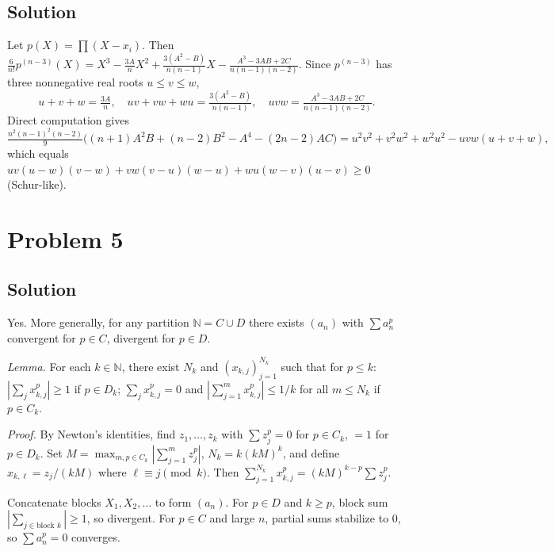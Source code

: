 \documentclass{article}
\begin{document}
\subsection*{Solution}
Let $p(X) = \prod(X - x_i)$. Then $\frac{6}{n!} p^{(n-3)}(X) = X^3 - \frac{3A}{n} X^2 + \frac{3(A^2-B)}{n(n-1)} X - \frac{A^3 - 3AB + 2C}{n(n-1)(n-2)}$. Since $p^{(n-3)}$ has three nonnegative real roots $u \le v \le w$,
\[ u+v+w = \tfrac{3A}{n},\quad uv+vw+wu = \tfrac{3(A^2-B)}{n(n-1)},\quad uvw = \tfrac{A^3-3AB+2C}{n(n-1)(n-2)}. \]
Direct computation gives
\[ \tfrac{n^2(n-1)^2(n-2)}{9}\big((n+1)A^2 B + (n-2) B^2 - A^4 - (2n-2) AC\big) = u^2 v^2 + v^2 w^2 + w^2 u^2 - uvw(u+v+w), \]
which equals $uv(u-w)(v-w) + vw(v-u)(w-u) + wu(w-v)(u-v) \ge 0$ (Schur-like).

\section*{Problem 5}
\subsection*{Solution}
Yes. More generally, for any partition $\mathbb{N} = C \cup D$ there exists $(a_n)$ with $\sum a_n^p$ convergent for $p \in C$, divergent for $p \in D$.

\emph{Lemma.} For each $k \in \mathbb{N}$, there exist $N_k$ and $(x_{k,j})_{j=1}^{N_k}$ such that for $p \le k$: $|\sum_j x_{k,j}^p| \ge 1$ if $p \in D_k$; $\sum_j x_{k,j}^p = 0$ and $|\sum_{j=1}^m x_{k,j}^p| \le 1/k$ for all $m \le N_k$ if $p \in C_k$.

\emph{Proof.} By Newton's identities, find $z_1, \dots, z_k$ with $\sum z_j^p = 0$ for $p \in C_k$, $= 1$ for $p \in D_k$. Set $M = \max_{m, p \in C_k} |\sum_{j=1}^m z_j^p|$, $N_k = k(kM)^k$, and define $x_{k,\ell} = z_j/(kM)$ where $\ell \equiv j \pmod k$. Then $\sum_{j=1}^{N_k} x_{k,j}^p = (kM)^{k-p} \sum z_j^p$.

Concatenate blocks $X_1, X_2, \dots$ to form $(a_n)$. For $p \in D$ and $k \ge p$, block sum $|\sum_{j \in \text{block } k}| \ge 1$, so divergent. For $p \in C$ and large $n$, partial sums stabilize to $0$, so $\sum a_n^p = 0$ converges.
\end{document}
